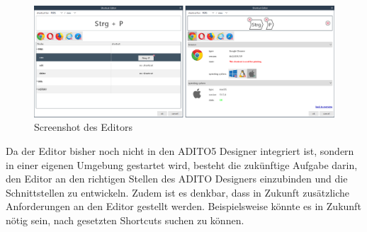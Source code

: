\vfill

\begin{figure}[H]
	\centering
	\includegraphics[width=1\linewidth]{../graphic/images/screenshots/Neuer-Editor}
	\caption{Screenshot des Editors}
	\label{fig:neuer-editor}
\end{figure}

\vfill

Da der Editor bisher noch nicht in den ADITO5 Designer integriert ist, sondern in einer eigenen Umgebung gestartet wird, besteht die zukünftige Aufgabe darin, den Editor an den richtigen Stellen des ADITO Designers einzubinden und die Schnittstellen zu entwickeln. Zudem ist es denkbar, dass in Zukunft zusätzliche Anforderungen an den Editor gestellt werden. Beispielsweise könnte es in Zukunft nötig sein, nach gesetzten Shortcuts suchen zu können.
